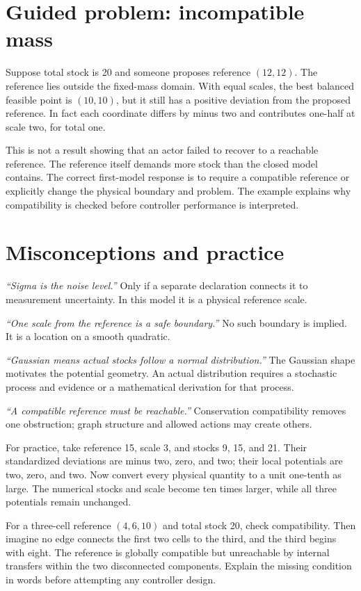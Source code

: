 \section{Guided problem: incompatible mass}
Suppose total stock is 20 and someone proposes reference \((12,12)\). The reference lies outside the fixed-mass domain. With equal scales, the best balanced feasible point is \((10,10)\), but it still has a positive deviation from the proposed reference. In fact each coordinate differs by minus two and contributes one-half at scale two, for total one.

This is not a result showing that an actor failed to recover to a reachable reference. The reference itself demands more stock than the closed model contains. The correct first-model response is to require a compatible reference or explicitly change the physical boundary and problem. The example explains why compatibility is checked before controller performance is interpreted.

\section{Misconceptions and practice}
\emph{``Sigma is the noise level.''} Only if a separate declaration connects it to measurement uncertainty. In this model it is a physical reference scale.

\emph{``One scale from the reference is a safe boundary.''} No such boundary is implied. It is a location on a smooth quadratic.

\emph{``Gaussian means actual stocks follow a normal distribution.''} The Gaussian shape motivates the potential geometry. An actual distribution requires a stochastic process and evidence or a mathematical derivation for that process.

\emph{``A compatible reference must be reachable.''} Conservation compatibility removes one obstruction; graph structure and allowed actions may create others.

For practice, take reference 15, scale 3, and stocks 9, 15, and 21. Their standardized deviations are minus two, zero, and two; their local potentials are two, zero, and two. Now convert every physical quantity to a unit one-tenth as large. The numerical stocks and scale become ten times larger, while all three potentials remain unchanged.

For a three-cell reference \((4,6,10)\) and total stock 20, check compatibility. Then imagine no edge connects the first two cells to the third, and the third begins with eight. The reference is globally compatible but unreachable by internal transfers within the two disconnected components. Explain the missing condition in words before attempting any controller design.

